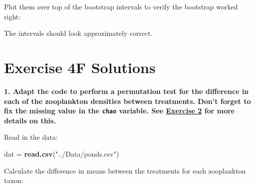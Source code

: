 \documentclass[]{book}
\newenvironment{Shaded}{\begin{snugshade}}{\end{snugshade}}
\newcommand{\KeywordTok}[1]{\textcolor[rgb]{0.13,0.29,0.53}{\textbf{#1}}}
\newcommand{\DataTypeTok}[1]{\textcolor[rgb]{0.13,0.29,0.53}{#1}}
\newcommand{\StringTok}[1]{\textcolor[rgb]{0.31,0.60,0.02}{#1}}
\newcommand{\OperatorTok}[1]{\textcolor[rgb]{0.81,0.36,0.00}{\textbf{#1}}}
\newcommand{\NormalTok}[1]{#1}
\theoremstyle{definition}
\theoremstyle{definition}
\theoremstyle{definition}
\theoremstyle{remark}
\begin{document}
Plot them over top of the bootstrap intervals to verify the bootstrap
worked right:

The intervals should look approximately correct.

\hypertarget{ex4f-answers}{\section*{Exercise 4F
Solutions}\label{ex4f-answers}}

\textbf{1. Adapt the code to perform a permutation test for the
difference in each of the zooplankton densities between treatments.
Don't forget to fix the missing value in the \texttt{chao} variable. See
\protect\hyperlink{ex1b}{Exercise 2} for more details on this.}

Read in the data:

\begin{Shaded}
\begin{Highlighting}[]
\NormalTok{dat =}\StringTok{ }\KeywordTok{read.csv}\NormalTok{(}\StringTok{"../Data/ponds.csv"}\NormalTok{)}
\end{Highlighting}
\end{Shaded}

Calculate the difference in means between the treatments for each
zooplankton taxon:

\begin{Shaded}
\end{Shaded}
\end{document}
